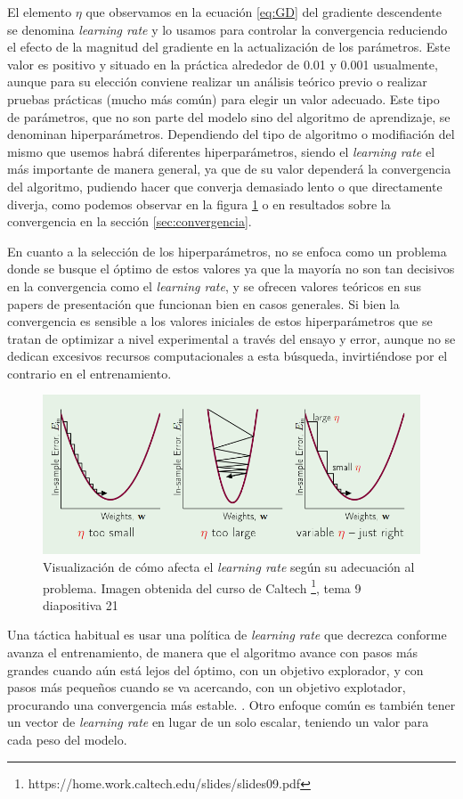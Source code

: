 El elemento $\eta$ que observamos en la ecuación \ref{eq:GD} del gradiente descendente se denomina \textit{learning rate} y lo usamos para controlar la convergencia reduciendo el efecto de la magnitud del gradiente en la actualización de los parámetros. Este valor es positivo y situado en la práctica alrededor de 0.01 y 0.001 usualmente, aunque para su elección conviene realizar un análisis teórico previo o realizar pruebas prácticas (mucho más común) para elegir un valor adecuado. Este tipo de parámetros, que no son parte del modelo sino del algoritmo de aprendizaje, se denominan hiperparámetros. Dependiendo del tipo de algoritmo o modifiación del mismo que usemos habrá diferentes hiperparámetros, siendo el \textit{learning rate} el más importante de manera general, ya que de su valor dependerá la convergencia del algoritmo, pudiendo hacer que converja demasiado lento o que directamente diverja, como podemos observar en la figura \ref{fig:lr} o en resultados sobre la convergencia en la sección \ref{sec:convergencia}.

En cuanto a la selección de los hiperparámetros, no se enfoca como un problema donde se busque el óptimo de estos valores ya que la mayoría no son tan decisivos en la convergencia como el \textit{learning rate}, y se ofrecen valores teóricos en sus papers de presentación que funcionan bien en casos generales. Si bien la convergencia es sensible a los valores iniciales de estos hiperparámetros que se tratan de optimizar a nivel experimental a través del ensayo y error, aunque no se dedican excesivos recursos computacionales a esta búsqueda, invirtiéndose por el contrario en el entrenamiento.



\begin{figure}
    \centering
    \includegraphics[width=0.5\linewidth]{Plantilla_TFG_latex//imagenes//Mat//GD/lr.png}
    \caption{Visualización de cómo afecta el \textit{learning rate} según su adecuación al problema. Imagen obtenida del curso de Caltech \footnote{https://home.work.caltech.edu/slides/slides09.pdf}, tema 9 diapositiva 21}
    \label{fig:lr}
\end{figure}

Una táctica habitual es usar una política de \textit{learning rate} que decrezca conforme avanza el entrenamiento, de manera que el algoritmo avance con pasos más grandes cuando aún está lejos del óptimo, con un objetivo explorador, y con pasos más pequeños cuando se va acercando, con un objetivo explotador, procurando una convergencia más estable. \cite{GoodFellowBook}. Otro enfoque común es también tener un vector de \textit{learning rate} en lugar de un solo escalar, teniendo un valor para cada peso del modelo. 





